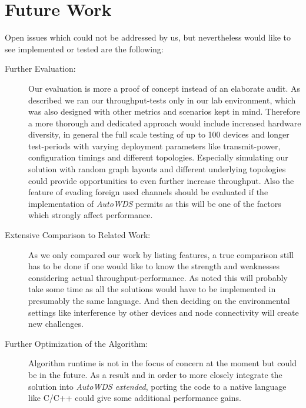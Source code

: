   \section{Future Work}
    Open issues which could not be addressed by us, but nevertheless would like 
    to see implemented or tested are the following:
    \begin{description}
      \item [Further Evaluation:]
	Our evaluation is more a proof of concept instead of an elaborate audit. As described we ran our throughput-tests only in our lab environment, 
	which was also designed with other metrics and scenarios kept in mind. Therefore a more thorough and dedicated approach would include increased hardware diversity, 
	in general the full scale testing of up to 100 devices and longer test-periods with varying deployment parameters like transmit-power, 
	configuration timings and different topologies.
	Especially simulating our solution with random graph layouts and different underlying topologies could provide opportunities to even further increase throughput.
	Also the feature of evading foreign used channels should be evaluated if the implementation of 
	\textit{AutoWDS} permits as this will be one of the factors which strongly affect performance.
      
      \item[Extensive Comparison to Related Work:]
	As we only compared our work by listing features, a true comparison still has to be done if one would 
	like to know the strength and weaknesses considering actual throughput-performance.
	As noted this will probably take some time as all the solutions would have to be 
	implemented in presumably the same language. And then deciding on the environmental settings
	like interference by other devices and node connectivity will create new challenges.
      
      \item[Further Optimization of the Algorithm:]
	Algorithm runtime is not in the focus of concern at the moment but could be in the future. 
	As a result and in order to more closely integrate the solution into \textit{AutoWDS extended},
	porting the code to a native language like C/C++ could give some additional performance gains.
      

\end{description}
